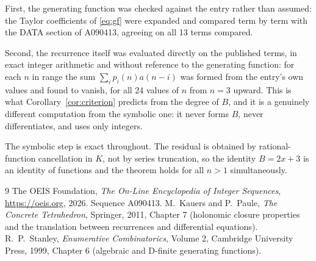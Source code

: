 \documentclass[11pt,a4paper]{article}
\theoremstyle{plain}
\theoremstyle{definition}
\begin{document}
First, the generating function was checked against the entry rather than assumed: the
Taylor coefficients of \eqref{eq:gf} were expanded and compared term by term with the DATA
section of A090413, agreeing on all 13 terms compared.

Second, the recurrence itself was evaluated directly on the published terms, in exact
integer arithmetic and without reference to the generating function: for each $n$ in range
the sum $\sum_{i}p_{i}(n)a(n-i)$ was formed from the entry's own values and found to
vanish, for all 24 values of $n$ from $n=3$ upward. This is what
Corollary~\ref{cor:criterion} predicts from the degree of $B$, and it is a genuinely
different computation from the symbolic one: it never forms $B$, never differentiates, and
uses only integers.

The symbolic step is exact throughout. The residual is obtained by rational-function
cancellation in $K$, not by series truncation, so the identity $B=2 x + 3$ is an
identity of functions and the theorem holds for all $n>1$ simultaneously.

\begin{thebibliography}{9}
 The OEIS Foundation, \emph{The On-Line Encyclopedia of Integer Sequences},
\url{https://oeis.org}, 2026. Sequence A090413.
 M.~Kauers and P.~Paule, \emph{The Concrete Tetrahedron}, Springer, 2011,
Chapter 7 (holonomic closure properties and the translation between recurrences and
differential equations).
 R.~P.~Stanley, \emph{Enumerative Combinatorics}, Volume 2, Cambridge
University Press, 1999, Chapter 6 (algebraic and D-finite generating functions).
\end{thebibliography}
\end{document}
